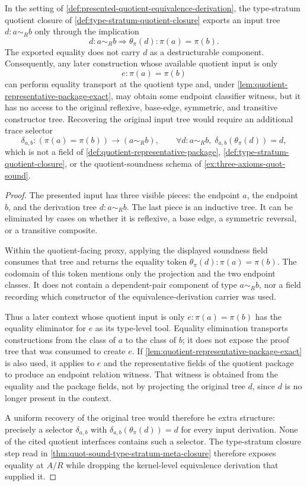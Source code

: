\begin{proposition}
\label{prop:type-stratum-meta-closure-drops-equivalence-derivations}
In the setting of \autoref{def:presented-quotient-equivalence-derivation}, the type-stratum quotient closure of \autoref{def:type-stratum-quotient-closure} exports an input tree $d:a\sim_R b$ only through the implication
$$
d:a\sim_R b\Longrightarrow \theta_\pi(d):\pi(a)=\pi(b).
$$
The exported equality does not carry $d$ as a destructurable component. Consequently, any later construction whose available quotient input is only
$$
e:\pi(a)=\pi(b)
$$
can perform equality transport at the quotient type and, under \autoref{lem:quotient-representative-package-exact}, may obtain some endpoint classifier witness, but it has no access to the original reflexive, base-edge, symmetric, and transitive constructor tree. Recovering the original input tree would require an additional trace selector
$$
\delta_{a,b}:(\pi(a)=\pi(b))\to(a\sim_R b),
\qquad
\forall d:a\sim_R b,\; \delta_{a,b}(\theta_\pi(d))=d,
$$
which is not a field of \autoref{def:quotient-representative-package}, \autoref{def:type-stratum-quotient-closure}, or the quotient-soundness schema of \autoref{ex:three-axioms-quot-sound}.
\end{proposition}

\begin{proof}
The presented input has three visible pieces: the endpoint $a$, the endpoint $b$, and the derivation tree $d:a\sim_R b$. The last piece is an inductive tree. It can be eliminated by cases on whether it is reflexive, a base edge, a symmetric reversal, or a transitive composite.

Within the quotient-facing proxy, applying the displayed soundness field consumes that tree and returns the equality token $\theta_\pi(d):\pi(a)=\pi(b)$. The codomain of this token mentions only the projection and the two endpoint classes. It does not contain a dependent-pair component of type $a\sim_R b$, nor a field recording which constructor of the equivalence-derivation carrier was used.

Thus a later context whose quotient input is only $e:\pi(a)=\pi(b)$ has the equality eliminator for $e$ as its type-level tool. Equality elimination transports constructions from the class of $a$ to the class of $b$; it does not expose the proof tree that was consumed to create $e$. If \autoref{lem:quotient-representative-package-exact} is also used, it applies to $e$ and the representative fields of the quotient package to produce an endpoint relation witness. That witness is obtained from the equality and the package fields, not by projecting the original tree $d$, since $d$ is no longer present in the context.

A uniform recovery of the original tree would therefore be extra structure: precisely a selector $\delta_{a,b}$ with $\delta_{a,b}(\theta_\pi(d))=d$ for every input derivation. None of the cited quotient interfaces contains such a selector. The type-stratum closure step read in \autoref{thm:quot-sound-type-stratum-meta-closure} therefore exposes equality at $A/R$ while dropping the kernel-level equivalence derivation that supplied it.
\end{proof}

